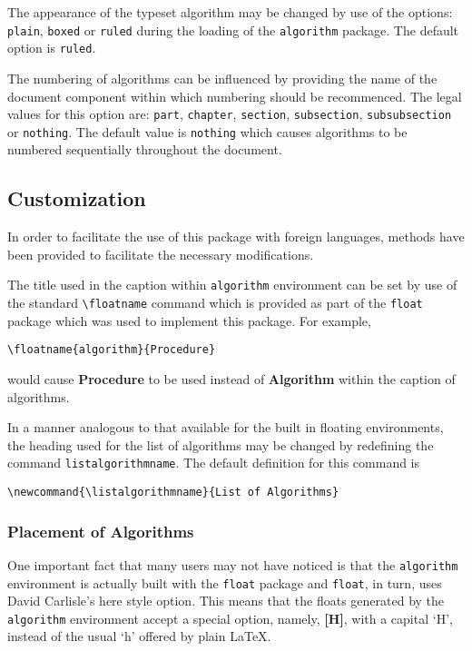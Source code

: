 \documentclass[letterpaper]{article}
\begin{document}
The appearance of the typeset algorithm may be changed by use of the
options: \texttt{plain}, \texttt{boxed} or \texttt{ruled} during the
loading of the \texttt{algorithm} package.  The default option is
\texttt{ruled}.

The numbering of algorithms can be influenced by providing the name of
the document component within which numbering should be recommenced.
The legal values for this option are: \texttt{part}, \texttt{chapter},
\texttt{section}, \texttt{subsection}, \texttt{subsubsection} or
\texttt{nothing}.  The default value is \texttt{nothing} which causes
algorithms to be numbered sequentially throughout the document.

\subsection{Customization}

In order to facilitate the use of this package with foreign languages,
methods have been provided to facilitate the necessary modifications.

The title used in the caption within \texttt{algorithm} environment can
be set by use of the standard \verb+\floatname+ command which is
provided as part of the \texttt{float} package which was used to
implement this package.  For example,
\begin{verbatim}
\floatname{algorithm}{Procedure}
\end{verbatim}
would cause \textbf{Procedure} to be used instead of \textbf{Algorithm}
within the caption of algorithms.

In a manner analogous to that available for the built in floating
environments, the heading used for the list of algorithms may be changed
by redefining the command \verb+listalgorithmname+.  The default
definition for this command is
\begin{verbatim}
\newcommand{\listalgorithmname}{List of Algorithms}
\end{verbatim}

\subsubsection{Placement of Algorithms}

One important fact that many users may not have noticed is that the
\texttt{algorithm} environment is actually built with the \texttt{float}
package and \texttt{float}, in turn, uses David Carlisle's \textsf{here}
style option. This means that the floats generated by the
\texttt{algorithm} environment accept a special option, namely,
\textbf{[H]}, with a capital `H', instead of the usual `h' offered by
plain \LaTeX.
\end{document}
